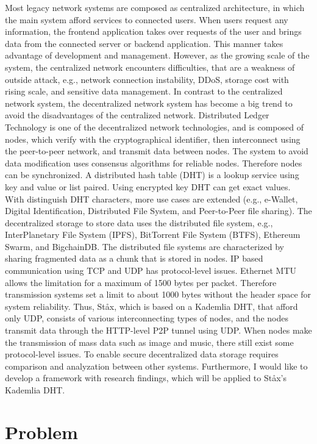 Most legacy network systems are composed as centralized architecture, in which the main system afford services to connected users. When users request any information, the frontend application takes over requests of the user and brings data from the connected server or backend application. This manner takes advantage of development and management. However, as the growing scale of the system, the centralized network encounters difficulties, that are a weakness of outside attack, e.g., network connection instability, DDoS, storage cost with rising scale, and sensitive data management. In contrast to the centralized network system, the decentralized network system has become a big trend to avoid the disadvantages of the centralized network. Distributed Ledger Technology is one of the decentralized network technologies, and is composed of nodes, which verify with the cryptographical identifier, then interconnect using the peer-to-peer network, and transmit data between nodes. The system to avoid data modification uses consensus algorithms for reliable nodes. Therefore nodes can be synchronized. A distributed hash table (DHT) \cite{sivaraja2008efficient} is a lookup service using key and value or list paired. Using encrypted key DHT can get exact values. With distinguish DHT characters, more use cases are extended (e.g., e-Wallet, Digital Identification, Distributed File System, and Peer-to-Peer file sharing). The decentralized storage to store data uses the distributed file system, e.g., InterPlanetary File System (IPFS), BitTorrent File System (BTFS), Ethereum Swarm, and BigchainDB. The distributed file systems are characterized by sharing fragmented data as a chunk that is stored in nodes. IP based communication using TCP and UDP has protocol-level issues. Ethernet MTU allows the limitation for a maximum of 1500 bytes per packet. Therefore transmission systems set a limit to about 1000 bytes without the header space for system reliability. Thus, St\aa x, which is based on a Kademlia DHT, that afford only UDP, consists of various interconnecting types of nodes, and the nodes transmit data through the HTTP-level P2P tunnel using UDP. When nodes make the transmission of mass data such as image and music, there still exist some protocol-level issues. To enable secure decentralized data storage requires comparison and analyzation between other systems. Furthermore, I would like to develop a framework with research findings, which will be applied to St\aa x's Kademlia DHT.

\section{Problem}

